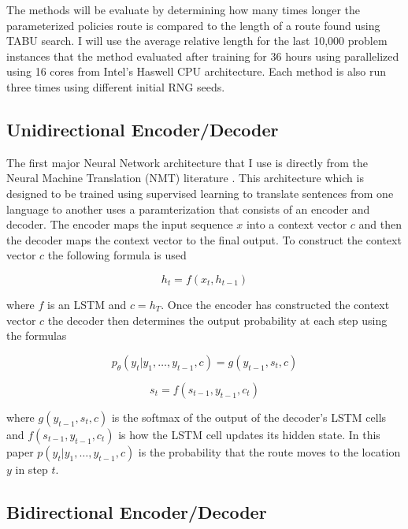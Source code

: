 \documentclass[12pt]{article}
\begin{document}
The methods will be evaluate by determining how many times longer the parameterized policies route is compared to the length of a route found using TABU search. I will use the average relative length for the last 10,000 problem instances that the method evaluated after training for 36 hours using parallelized using 16 cores from Intel's Haswell CPU architecture. Each method is also run three times using different initial RNG seeds.

\subsection{Unidirectional Encoder/Decoder}

The first major Neural Network architecture that I use is directly from the Neural Machine Translation (NMT) literature \citep{2014_sut}. This architecture which is designed to be trained using supervised learning to translate sentences from one language to another uses a paramterization that consists of an encoder and decoder. The encoder maps the input sequence $x$ into a context vector $c$ and then the decoder maps the context vector to the final output. To construct the context vector $c$ the following formula is used

\begin{equation*}
  h_t=f(x_t,h_{t-1})
\end{equation*}

where $f$ is an LSTM and $c=h_T$.
Once the encoder has constructed the context vector $c$ the decoder then determines the output probability at each step using the formulas

\begin{equation*}
  p_\theta(y_t|y_1,\dots,y_{t-1}, c)=g(y_{t-1},s_t, c)
\end{equation*}

\begin{equation*}
  s_t=f(s_{t-1},y_{t-1},c_t)
\end{equation*}

where $g(y_{t-1},s_t, c)$ is the softmax of the output of the decoder's LSTM cells and $f(s_{t-1},y_{t-1},c_t)$ is how the LSTM cell updates its hidden state. In this paper $p(y_t|y_1,\dots,y_{t-1}, c)$ is the probability that the route moves to the location $y$ in step $t$.

\subsection{Bidirectional Encoder/Decoder}
\end{document}
